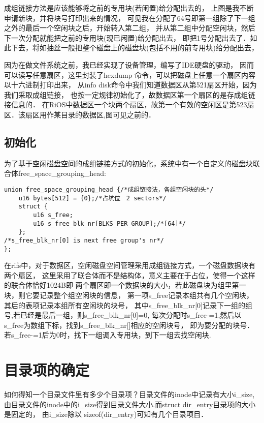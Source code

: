 成组链接方法是应该能够将之前的专用块(若闲置)给分配出去的，
上图是我不断申请新块，并将块号打印出来的情况，
可见我在分配了64号即第一组除了下一组之外的最后一个空闲块之后，开始转入第二组，
并从第二组中分配空闲块，然后下一次分配就能把之前的专用块(现已闲置)给分配出去，
即把1号分配出去了．如此下去，将如抽丝一般把整个磁盘上的磁盘块(包括不用的前专用块)给分配出去，

因为在做文件系统之前，我已经实现了设备管理，编写了IDE硬盘的驱动，
因而可以读写任意扇区，这里封装了hexdump 命令，可以把磁盘上任意一个扇区内容以十六进制打印出来，
从info disk命令中我们知道数据区从第521扇区开始，因为我们采取成组链接，
也按一定规律初始化了，故数据区第一个扇区的是存成组链接信息的．
在RiOS中数据区一个块两个扇区，故第一个有效的空闲区是第523扇区．该扇区用作某目录的数据区,图可见之前的．


\subsection{初始化}

为了基于空闲磁盘空间的成组链接方式的初始化，系统中有一个自定义的磁盘块联合体free\_space\_grouping\_head:

\begin{verbatim}
union free_space_grouping_head {/*成组链接法，各组空闲块的头*/
	u16 bytes[512] = {0};/*占坑位　2 sectors*/
	struct {
		u16 s_free;
		u16 s_free_blk_nr[BLKS_PER_GROUP];/*[64]*/
	};
/*s_free_blk_nr[0] is next free group's nr*/
};	
\end{verbatim}

在rifs中，对于数据区，空闲磁盘空间管理采用成组链接方式，一个磁盘数据块有两个扇区，
这里采用了联合体而不是结构体，意义主要在于占位，使得一个这样的联合体恰好1024B即
两个扇区即一个数据块的大小，若此磁盘块为组里第一块，则它要记录整个组空闲块的信息，
第一项s\_free记录本组共有几个空闲块，其后的表项记录本组所有空闲块的块号，
其中s\_free\_blk\_nr[0]记录下一组的组号,若已经是最后一组，则s\_free\_blk\_nr[0]=0,
每次分配时s\_free-=1,然后以s\_free为数组下标，找到s\_free\_blk\_nr[]相应的空闲块号，
即为要分配的块号．若s\_free-=1后为0时，找下一组调入专用块，到下一组去找空闲块.


\section{目录项的确定}
如何得知一个目录文件里有多少个目录项？目录文件的inode中记录有大小i\_size,
由目录文件的inode中的i\_size得到目录文件大小.而struct dir\_entry目录项的大小是固定的，
由i\_size除以 sizeof(dir\_entry)可知有几个目录项目．

